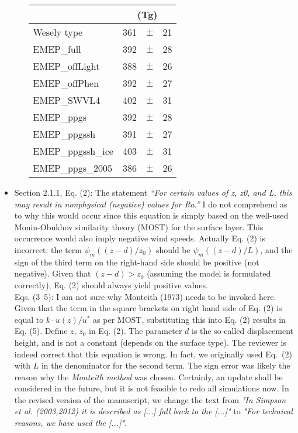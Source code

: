 \documentclass{scrartcl}
\begin{document}
\begin{itemize}
\begin{itemize}
\begin{table*}[h]
\begin{tabular}{lrcl}
          &  \multicolumn{3}{c}{(Tg)}\\
          \hline
          Wesely type & 361 & $\pm$ & 21\\
          EMEP\_full & 392 & $\pm$ & 28\\
          EMEP\_offLight & 388 & $\pm$ & 26\\
          EMEP\_offPhen & 392 & $\pm$ & 27\\
          EMEP\_SWVL4 & 402 & $\pm$ & 31\\
          EMEP\_ppgs & 392 & $\pm$ & 28\\
          EMEP\_ppgssh & 391 & $\pm$ & 27\\
          EMEP\_ppgssh\_ice & 403 & $\pm$ & 31\\
          EMEP\_ppgs\_2005 & 386 & $\pm$ & 26\\
          \hline
        \end{tabular}
        \label{tab:trop_ozone_burden}
    \end{table*}
  \end{itemize}
  
\item {\color{blue}  Section 2.1.1, Eq. (2): The statement \emph{“For certain values of z, z0, and L, this
    may result in nonphysical (negative) values for Ra.”} I do not comprehend as to why
  this would occur since this equation is simply based on the well-used Monin-Obukhov
  similarity theory (MOST) for the surface layer. This occurrence would also imply negative wind speeds.
  Actually Eq. (2) is incorrect: the term $\psi_m((z-d)/z_0)$ should be
  $\psi_m((z-d)/L)$, and the sign of the third term on the right-hand side should be positive
  (not negative). Given that $(z-d) > z_0$ (assuming the model is formulated correctly), Eq. (2) should always yield positive values.\\
  Eqs. (3--5): I am not sure why Monteith (1973) needs to be invoked here. Given that
  the term in the square brackets on right hand side of Eq. (2) is equal to $k\cdot u(z)/u^{*}$ as per
  MOST, substituting this into Eq. (2) results in Eq. (5).
  Define $z$, $z_0$ in Eq. (2). The parameter $d$ is the so-called displacement height, and is
  not a constant (depends on the surface type).}
  The reviewer is indeed correct that this equation is wrong. In fact, we originally
  used Eq.~(2) with $L$ in the denominator for the second term. The sign error was likely the reason why the \emph{Monteith method}
  was chosen. Certainly, an update shall be considered in the future, but it is not feasible to
  redo all simulations now. In the revised version of the manuscript, we change the text from \emph{"In Simpson et al.
  (2003,2012) it is described as [...] fall back to the [...]"} to \emph{"For technical reasons, we
have used the [...]"}.


\end{itemize}
\end{document}
